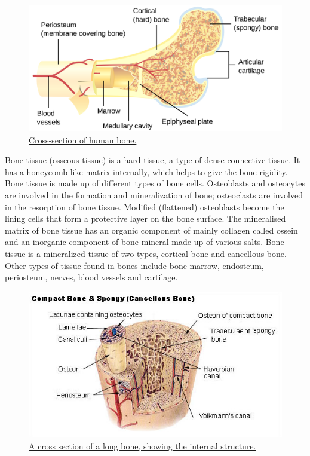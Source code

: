 \begin{figure}

{\centering \includegraphics[width=0.7\linewidth]{./figures/locomotion/Bone_cross-section} 

}

\caption{\href{https://commons.wikimedia.org/wiki/File:Human_skeleton_back_en.svg}{Cross-section of human bone.}}\label{fig:bonecrossection}
\end{figure}

Bone tissue (osseous tissue) is a hard tissue, a type of dense connective tissue. It has a honeycomb-like matrix internally, which helps to give the bone rigidity. Bone tissue is made up of different types of bone cells. Osteoblasts and osteocytes are involved in the formation and mineralization of bone; osteoclasts are involved in the resorption of bone tissue. Modified (flattened) osteoblasts become the lining cells that form a protective layer on the bone surface. The mineralised matrix of bone tissue has an organic component of mainly collagen called ossein and an inorganic component of bone mineral made up of various salts. Bone tissue is a mineralized tissue of two types, cortical bone and cancellous bone. Other types of tissue found in bones include bone marrow, endosteum, periosteum, nerves, blood vessels and cartilage.



\begin{figure}

{\centering \includegraphics[width=0.7\linewidth]{./figures/locomotion/Illu_compact_spongy_bone} 

}

\caption{\href{https://commons.wikimedia.org/wiki/File:Illu_compact_spongy_bone.jpg}{A cross section of a long bone, showing the internal structure.}}\label{fig:anotherbonecrossection}
\end{figure}

